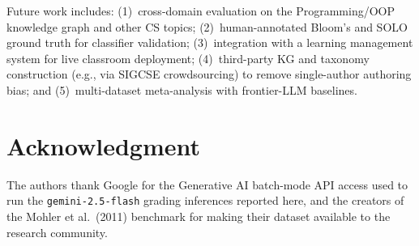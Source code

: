 \documentclass[conference]{IEEEtran}
\begin{document}
Future work includes: (1)~cross-domain evaluation on the Programming/OOP knowledge
graph and other CS topics; (2)~human-annotated Bloom's and SOLO ground truth for
classifier validation; (3)~integration with a learning management system for live
classroom deployment; (4)~third-party KG and taxonomy construction (e.g., via
SIGCSE crowdsourcing) to remove single-author authoring bias; and
(5)~multi-dataset meta-analysis with frontier-LLM baselines.

\section*{Acknowledgment}

The authors thank Google for the Generative AI batch-mode API access used
to run the \texttt{gemini-2.5-flash} grading inferences reported here, and
the creators of the Mohler et al.\ (2011) benchmark for making their
dataset available to the research community.
\end{document}
